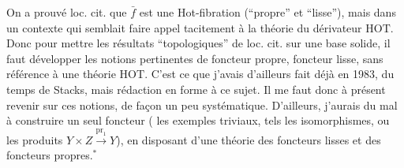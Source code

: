 On a prouvé  loc. cit. que $\bar f$ est une
Hot-fibration (``propre'' et ``lisse''), mais dans un
contexte qui semblait faire appel tacitement à
la théorie du dérivateur $\mathrm{HOT}$. Donc pour
mettre les résultats ``topologiques'' de loc. cit.
sur une base solide, il faut développer les
notions pertinentes de foncteur propre, foncteur
lisse, sans référence à une théorie $\mathrm{HOT}$. C'est
ce que j'avais d'ailleurs fait déjà 
en 1983, du temps de  Stacks,
mais  rédaction en forme à ce sujet. Il
me faut donc à présent revenir sur ces
notions, de façon un peu systématique. D'ailleurs,
j'aurais du mal à construire un seul foncteur
 (  les exemples triviaux,
tels les isomorphismes\deleted{\unsure{)}}, ou les produits $Y\times Z\xrightarrow{\mathrm{pr}_1}Y$),
en disposant d'une théorie des
foncteurs lisses et des foncteurs propres.$^{*}$

